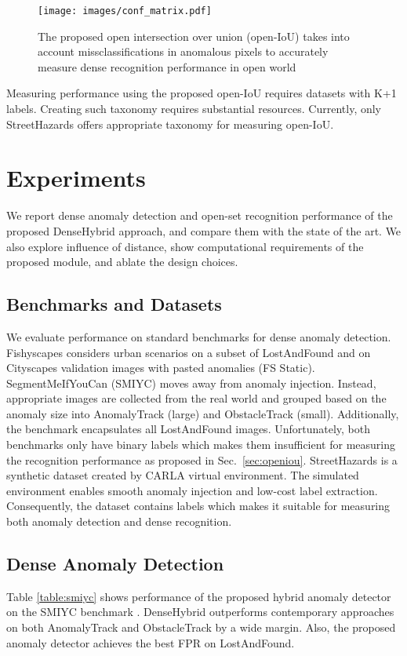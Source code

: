\documentclass[runningheads]{llncs}
\begin{document}
\begin{figure}
    \centering
    \texttt{[image: images/conf\_matrix.pdf]}
    \caption{
    The proposed open intersection over union (open-IoU) takes into account missclassifications in anomalous pixels to accurately measure dense recognition performance in open world}
    \label{fig:conf_mat}
\end{figure}
Measuring performance using the proposed open-IoU requires datasets with K+1 labels.
Creating such taxonomy requires substantial resources.
Currently, only StreetHazards \cite{hendrycks19arxiv} offers appropriate taxonomy for measuring open-IoU.

\section{Experiments}

We report dense anomaly detection and open-set recognition performance of the proposed DenseHybrid approach, and compare them with the state of the art.
We also explore influence of distance, show computational requirements of the proposed module, and ablate the design choices.


\subsection{Benchmarks and Datasets}

We evaluate performance on standard benchmarks for dense anomaly detection.
Fishyscapes \cite{blum21ijcv} considers urban scenarios on a subset of LostAndFound \cite{pinggera16iros} and on Cityscapes validation images with pasted anomalies (FS Static).
SegmentMeIfYouCan (SMIYC) \cite{chan21arxiv} moves away from anomaly injection.
Instead, appropriate images are collected from the real world and grouped based on the anomaly size into AnomalyTrack (large) and ObstacleTrack (small).
Additionally, the benchmark encapsulates all LostAndFound images.
Unfortunately, both benchmarks only have binary labels which makes them insufficient for measuring the recognition performance as proposed in Sec.\ \ref{sec:openiou}.
StreetHazards \cite{hendrycks19arxiv} is a synthetic dataset created by CARLA virtual environment.
The simulated environment enables smooth anomaly injection and low-cost label extraction.
Consequently, the dataset contains  labels which makes it suitable for measuring both anomaly detection and dense recognition.




\subsection{Dense Anomaly Detection}
\label{sec:res_anomdet}
Table \ref{table:smiyc} shows performance of 
the proposed hybrid 
anomaly detector on the SMIYC benchmark \cite{chan21arxiv}.
DenseHybrid outperforms contemporary approaches on both AnomalyTrack and ObstacleTrack by a wide margin.
Also, the proposed anomaly detector 
achieves the best FPR on LostAndFound.
\end{document}

